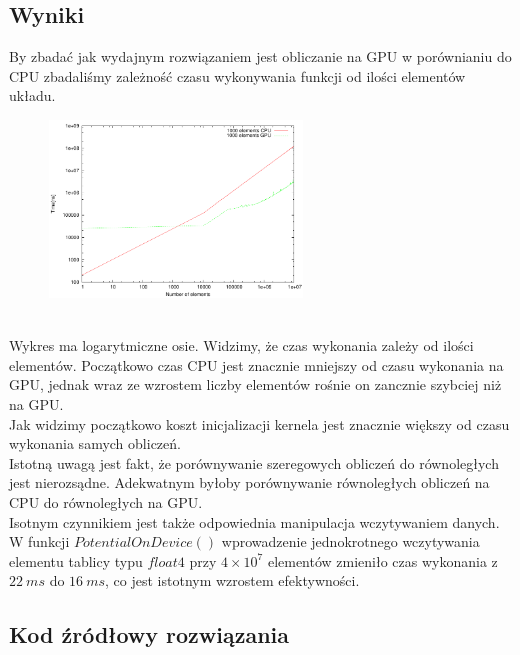 \documentclass[paper=a4, fontsize=11pt]{scrartcl} %
\numberwithin{equation}{section} %
\numberwithin{figure}{section} %
\numberwithin{table}{section} %
\begin{document}
\subsection{Wyniki}
By zbadać jak wydajnym rozwiązaniem jest obliczanie na GPU w porównianiu do CPU zbadaliśmy zależność czasu wykonywania funkcji od ilości elementów układu.
\begin{figure}[h]
\centering
\includegraphics[width=0.6\textwidth]{timesa.pdf}
\label{.}
\end{figure}\\
Wykres ma logarytmiczne osie. Widzimy, że czas wykonania zależy od ilości elementów. Początkowo czas CPU jest znacznie mniejszy od czasu wykonania na GPU, jednak wraz ze wzrostem liczby elementów rośnie on zancznie szybciej niż na GPU. \\ 
Jak widzimy początkowo koszt inicjalizacji kernela jest znacznie większy od czasu wykonania samych obliczeń.\\
Istotną uwagą jest fakt, że porównywanie szeregowych obliczeń do równoległych jest nierozsądne. Adekwatnym byłoby porównywanie równoległych obliczeń na CPU do równoległych na GPU.\\
Isotnym czynnikiem jest także odpowiednia manipulacja wczytywaniem danych. W funkcji $PotentialOnDevice()$ wprowadzenie jednokrotnego wczytywania elementu tablicy typu $float4$ przy $4\times 10^7$ elementów zmieniło czas wykonania z $22\:ms$ do $16\:ms$, co jest istotnym wzrostem efektywności.
\newpage
\subsection{Kod źródłowy rozwiązania}

\end{document}
